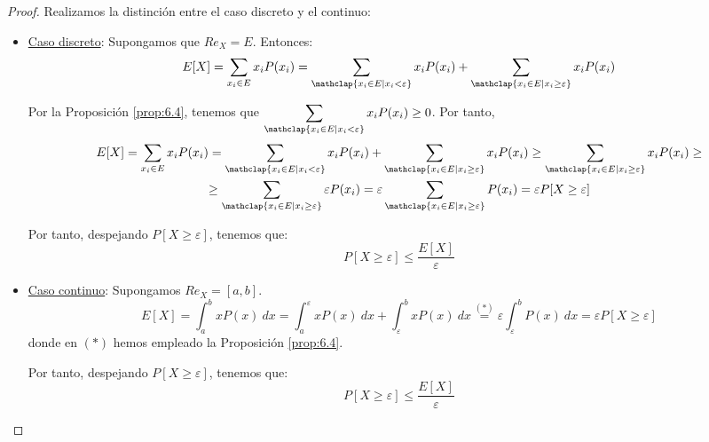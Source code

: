 \begin{proof}
    Realizamos la distinción entre el caso discreto y el continuo:
    \begin{itemize}
        \item \underline{Caso discreto}: Supongamos que $Re_X=E$. Entonces:
        \begin{equation*}
            E[X]=\sum_{x_i\in E}x_iP(x_i)
            = \sum_{\mathclap{x_i\in E\mid x_i<\varepsilon}}x_iP(x_i) + \sum_{\mathclap{x_i\in E\mid x_i\geq \varepsilon}}x_iP(x_i)
        \end{equation*}

        Por la Proposición \ref{prop:6.4}, tenemos que $\displaystyle \sum\limits_{\mathclap{x_i\in E\mid x_i<\varepsilon}}x_iP(x_i)\geq 0$. Por tanto,
        \begin{multline*}
            E[X]
            =\sum_{x_i\in E}x_iP(x_i)
            = \sum_{\mathclap{x_i\in E\mid x_i<\varepsilon}}x_iP(x_i) + \sum_{\mathclap{x_i\in E\mid x_i\geq \varepsilon}}x_iP(x_i)
            \geq \sum_{\mathclap{x_i\in E\mid x_i\geq \varepsilon}}x_iP(x_i)
            \geq\\
            \geq \sum_{\mathclap{x_i\in E\mid x_i\geq \varepsilon}}\varepsilon P(x_i)
            = \varepsilon \sum_{\mathclap{x_i\in E\mid x_i\geq \varepsilon}} P(x_i)
            = \varepsilon P[X\geq \varepsilon]
        \end{multline*}

        Por tanto, despejando $P[X\geq \varepsilon]$, tenemos que:
        \begin{equation*}
            P[X\geq \varepsilon] \leq \frac{E[X]}{\varepsilon}
        \end{equation*}

        \item \underline{Caso continuo}: Supongamos $Re_X=[a,b]$. 
        \begin{equation*}
            E[X]
            =\int_a^b xP(x)~dx
            =\int_a^\varepsilon xP(x)~dx + \int_\varepsilon^b xP(x)~dx
            \stackrel{(\ast)}{=} \varepsilon \int_\varepsilon^b P(x)~dx
            = \varepsilon P[X\geq \varepsilon]
        \end{equation*}
        donde en $(\ast)$ hemos empleado la Proposición \ref{prop:6.4}.

        Por tanto, despejando $P[X\geq \varepsilon]$, tenemos que:
        \begin{equation*}
            P[X\geq \varepsilon] \leq \frac{E[X]}{\varepsilon}
        \end{equation*}
    \end{itemize}
\end{proof}

